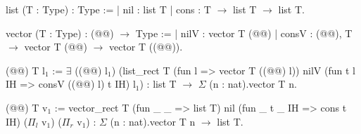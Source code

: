 list (T : Type) : Type :=
| nil : list T
| cons : 
    T $\rightarrow$ list T $\rightarrow$ list T.

vector (T : Type) : (@@) $\rightarrow$ Type :=
| nilV : vector T (@@)
| consV : 
    (@@), T $\rightarrow$ vector T (@@) $\rightarrow$ vector T ((@@)).


(@@) {T} l$_1$ :=
  $\exists$ ((@@) l$_1$) (list_rect T
    (fun l => vector T ((@@) l))
    nilV
    (fun t l IH => consV ((@@) l) t IH) 
    l$_1$)
: list T $\rightarrow$ $\Sigma$ (n : nat).vector T n. 

(@@) {T} v$_1$ :=
  vector_rect T
    (fun _ _ => list T) 
    nil
    (fun _ t _ IH => cons t IH) 
    ($\Pi_l$ v$_1$) ($\Pi_r$ v$_1$)
: $\Sigma$ (n : nat).vector T n $\rightarrow$ list T.
